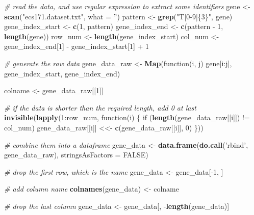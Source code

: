 \documentclass{article}
\newenvironment{Shaded}{}{}
\newcommand{\KeywordTok}[1]{\textcolor[rgb]{0.00,0.44,0.13}{\textbf{{#1}}}}
\newcommand{\DataTypeTok}[1]{\textcolor[rgb]{0.56,0.13,0.00}{{#1}}}
\newcommand{\DecValTok}[1]{\textcolor[rgb]{0.25,0.63,0.44}{{#1}}}
\newcommand{\StringTok}[1]{\textcolor[rgb]{0.25,0.44,0.63}{{#1}}}
\newcommand{\CommentTok}[1]{\textcolor[rgb]{0.38,0.63,0.69}{\textit{{#1}}}}
\newcommand{\OtherTok}[1]{\textcolor[rgb]{0.00,0.44,0.13}{{#1}}}
\newcommand{\NormalTok}[1]{{#1}}
\begin{document}
    \begin{Shaded}
\begin{Highlighting}[]
\CommentTok{# read the data, and use regular expression to extract some identifiers}
\NormalTok{gene <-}\StringTok{ }\KeywordTok{scan}\NormalTok{(}\StringTok{"ecs171.dataset.txt"}\NormalTok{, }\DataTypeTok{what =} \StringTok{''}\NormalTok{)}
\NormalTok{pattern <-}\StringTok{ }\KeywordTok{grep}\NormalTok{(}\StringTok{"T[0-9]\{3\}"}\NormalTok{, gene)}
\NormalTok{gene_index_start <-}\StringTok{ }\KeywordTok{c}\NormalTok{(}\DecValTok{1}\NormalTok{, pattern)}
\NormalTok{gene_index_end <-}\StringTok{ }\KeywordTok{c}\NormalTok{(pattern -}\StringTok{ }\DecValTok{1}\NormalTok{, }\KeywordTok{length}\NormalTok{(gene))}
\NormalTok{row_num <-}\StringTok{ }\KeywordTok{length}\NormalTok{(gene_index_start)}
\NormalTok{col_num <-}\StringTok{ }\NormalTok{gene_index_end[}\DecValTok{1}\NormalTok{] -}\StringTok{ }\NormalTok{gene_index_start[}\DecValTok{1}\NormalTok{] +}\StringTok{ }\DecValTok{1}

\CommentTok{# generate the raw data}
\NormalTok{gene_data_raw <-}\StringTok{ }\KeywordTok{Map}\NormalTok{(function(i, j) gene[i:j], gene_index_start, gene_index_end)}

\NormalTok{colname <-}\StringTok{ }\NormalTok{gene_data_raw[[}\DecValTok{1}\NormalTok{]]}

\CommentTok{# if the data is shorter than the required length, add 0 at last}
\KeywordTok{invisible}\NormalTok{(}\KeywordTok{lapply}\NormalTok{(}\DecValTok{1}\NormalTok{:row_num, function(i) \{}
  \NormalTok{if (}\KeywordTok{length}\NormalTok{(gene_data_raw[[i]]) !=}\StringTok{ }\NormalTok{col_num) gene_data_raw[[i]] <<-}\StringTok{ }\KeywordTok{c}\NormalTok{(gene_data_raw[[i]], }\DecValTok{0}\NormalTok{)}
\NormalTok{\}))}

\CommentTok{# combine them into a dataframe}
\NormalTok{gene_data <-}\StringTok{ }\KeywordTok{data.frame}\NormalTok{(}\KeywordTok{do.call}\NormalTok{(}\StringTok{'rbind'}\NormalTok{, gene_data_raw), }\DataTypeTok{stringsAsFactors =} \OtherTok{FALSE}\NormalTok{)}

\CommentTok{# drop the first row, which is the name}
\NormalTok{gene_data <-}\StringTok{ }\NormalTok{gene_data[-}\DecValTok{1}\NormalTok{, ]}

\CommentTok{# add column name}
\KeywordTok{colnames}\NormalTok{(gene_data) <-}\StringTok{ }\NormalTok{colname}

\CommentTok{# drop the last column}
\NormalTok{gene_data <-}\StringTok{ }\NormalTok{gene_data[, -}\KeywordTok{length}\NormalTok{(gene_data)]}


\end{Highlighting}
\end{Shaded}
\end{document}
